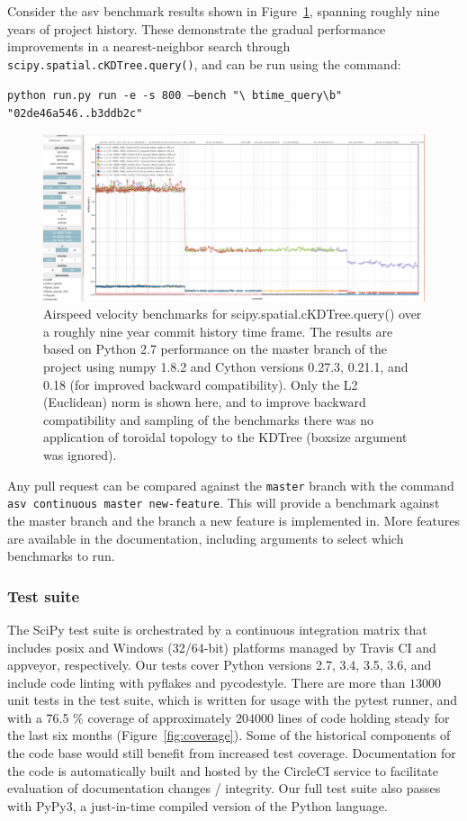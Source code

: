\documentclass[fleqn,10pt]{wlscirep}
\begin{document}
Consider the asv benchmark results shown in Figure~\ref{fig:asvbench}, spanning
roughly nine years of project history. These demonstrate the gradual
performance improvements in a nearest-neighbor search through
\texttt{scipy.spatial.cKDTree.query()}, and can be run using the command:


\texttt{python run.py run -e -s 800 --bench "\textbackslash
btime\_query\textbackslash b" "02de46a546..b3ddb2c"}

\begin{figure}[H]
\centering
\includegraphics[width=\textwidth]{static/asv_time_query_ckdtree}
\caption{Airspeed velocity benchmarks for scipy.spatial.cKDTree.query()
over a roughly nine year commit history time frame. The results are based on
Python 2.7 performance on the master branch of the project using numpy 1.8.2
and Cython versions 0.27.3, 0.21.1, and 0.18 (for improved backward
compatibility). Only the L2 (Euclidean) norm is shown here, and to improve
backward compatibility and sampling of the benchmarks there was no application
of toroidal topology to the KDTree (boxsize argument was ignored).}
\label{fig:asvbench}
\end{figure}

Any pull request can be compared against the \texttt{master} branch with the
command \texttt{asv continuous master new-feature}. This will provide a
benchmark against the master branch and the branch a new feature is implemented
in. More features are available in the documentation, including arguments to
select which benchmarks to run.

\subsubsection*{Test suite}

The SciPy test suite is orchestrated by a continuous integration matrix that
includes posix and Windows (32/64-bit) platforms managed by Travis CI and
appveyor, respectively. Our tests cover Python versions 2.7, 3.4, 3.5, 3.6, and
include code linting with pyflakes and pycodestyle. There are more than $13000$
unit tests in the test suite, which is written for usage with the pytest
runner, and with a 76.5 \% coverage of approximately $204000$ lines of code
holding steady for the last six months (Figure~\ref{fig:coverage}).  Some of
the historical components of the code base would still benefit from increased
test coverage. Documentation for the code is automatically built and hosted by
the CircleCI service to facilitate evaluation of documentation changes /
integrity.  Our full test suite also passes with PyPy3, a just-in-time compiled
version of the Python language.
\end{document}
